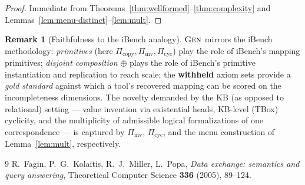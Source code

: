 \documentclass{amsart}
\theoremstyle{definition}
\newtheorem{remark}{Remark}
\begin{document}
\begin{proof}
Immediate from Theorems~\ref{thm:wellformed}--\ref{thm:complexity} and
Lemmas~\ref{lem:menu-distinct}--\ref{lem:mult}.
\end{proof}

\begin{remark}[Faithfulness to the iBench analogy]
$\textsc{Gen}$ mirrors the iBench methodology: \emph{primitives} (here
$\Pi_{\mathrm{copy}},\Pi_{\mathrm{inv}},\Pi_{\mathrm{cyc}}$) play the role of
iBench's mapping primitives; \emph{disjoint composition} $\oplus$ plays the role
of iBench's primitive instantiation and replication to reach scale; the
\textbf{withheld} axiom sets provide a \emph{gold standard} against which a tool's
recovered mapping can be scored on the incompleteness dimensions. The novelty
demanded by the KB (as opposed to relational) setting — value invention via
existential heads, KB-level (TBox) cyclicity, and the multiplicity of admissible
logical formalizations of one correspondence — is captured by
$\Pi_{\mathrm{inv}}$, $\Pi_{\mathrm{cyc}}$, and the menu construction of
Lemma~\ref{lem:mult}, respectively.
\end{remark}

\begin{thebibliography}{9}
 R.~Fagin, P.~G.~Kolaitis, R.~J.~Miller, L.~Popa,
\emph{Data exchange: semantics and query answering}, Theoretical Computer
Science \textbf{336} (2005), 89--124.
\end{thebibliography}
\end{document}
